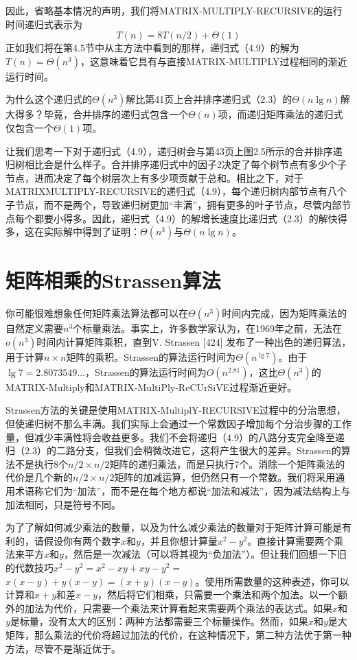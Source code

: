 \documentclass[lang=cn,newtx,10pt,scheme=chinese]{elegantbook}
\begin{document}
因此，省略基本情况的声明，我们将MATRIX-MULTIPLY-RECURSIVE的运行时间递归式表示为
$$
T(n)=8 T(n / 2)+\Theta(1)
$$
正如我们将在第4.5节中从主方法中看到的那样，递归式（4.9）的解为$T(n)=\Theta\left(n^3\right)$，这意味着它具有与直接MATRIX-MULTIPLY过程相同的渐近运行时间。

为什么这个递归式的$\Theta\left(n^3\right)$解比第41页上合并排序递归式（2.3）的$\Theta(n \lg n)$解大得多？毕竟，合并排序的递归式包含一个$\Theta(n)$项，而递归矩阵乘法的递归式仅包含一个$\Theta(1)$项。

让我们思考一下对于递归式（4.9），递归树会与第43页上图2.5所示的合并排序递归树相比会是什么样子。合并排序递归式中的因子2决定了每个树节点有多少个子节点，进而决定了每个树层次上有多少项贡献于总和。相比之下，对于MATRIXMULTIPLY-RECURSIVE的递归式（4.9），每个递归树内部节点有八个子节点，而不是两个，导致递归树更加“丰满”，拥有更多的叶子节点，尽管内部节点每个都要小得多。因此，递归式（4.9）的解增长速度比递归式（2.3）的解快得多，这在实际解中得到了证明：$\Theta\left(n^3\right)$与$\Theta(n \lg n)$。

\section{矩阵相乘的Strassen算法}

你可能很难想象任何矩阵乘法算法都可以在$\Theta\left(n^3\right)$时间内完成，因为矩阵乘法的自然定义需要$n^3$个标量乘法。事实上，许多数学家认为，在1969年之前，无法在$o\left(n^3\right)$时间内计算矩阵乘积，直到V. Strassen [424] 发布了一种出色的递归算法，用于计算$n \times n$矩阵的乘积。Strassen的算法运行时间为$\Theta\left(n^{\lg 7}\right)$。由于$\lg 7=2.8073549 \ldots$，Strassen的算法运行时间为$O\left(n^{2.81}\right)$，这比$\Theta\left(n^3\right)$的MATRIX-Multiply和MATRIX-MultiPly-ReCUrSiVE过程渐近更好。

Strassen方法的关键是使用MATRIX-MultiplY-RECURSIVE过程中的分治思想，但使递归树不那么丰满。我们实际上会通过一个常数因子增加每个分治步骤的工作量，但减少丰满性将会收益更多。我们不会将递归（4.9）的八路分支完全降至递归（2.3）的二路分支，但我们会稍微改进它，这将产生很大的差异。Strassen的算法不是执行$8$个$n / 2 \times n / 2$矩阵的递归乘法，而是只执行$7$个。消除一个矩阵乘法的代价是几个新的$n / 2 \times n / 2$矩阵的加减运算，但仍然只有一个常数。我们将采用通用术语称它们为“加法”，而不是在每个地方都说“加法和减法”，因为减法结构上与加法相同，只是符号不同。

为了了解如何减少乘法的数量，以及为什么减少乘法的数量对于矩阵计算可能是有利的，请假设你有两个数字$x$和$y$，并且你想计算量$x^2-y^2$。直接计算需要两个乘法来平方$x$和$y$，然后是一次减法（可以将其视为“负加法”）。但让我们回想一下旧的代数技巧$x^2-y^2=x^2-x y+x y-y^2=$ $x(x-y)+y(x-y)=(x+y)(x-y)$。使用所需数量的这种表述，你可以计算和$x+y$和差$x-y$，然后将它们相乘，只需要一个乘法和两个加法。以一个额外的加法为代价，只需要一个乘法来计算看起来需要两个乘法的表达式。如果$x$和$y$是标量，没有太大的区别：两种方法都需要三个标量操作。然而，如果$x$和$y$是大矩阵，那么乘法的代价将超过加法的代价，在这种情况下，第二种方法优于第一种方法，尽管不是渐近优于。
\end{document}
